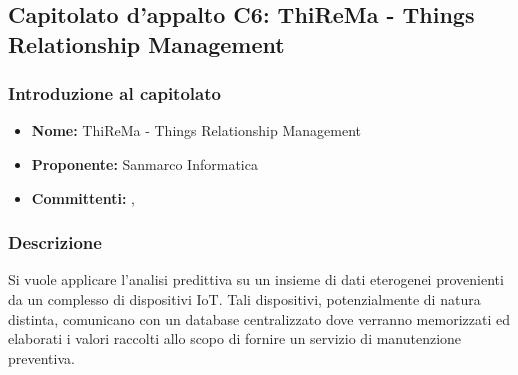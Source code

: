 \subsection{Capitolato d'appalto C6: ThiReMa - Things Relationship Management}
	\subsubsection{Introduzione al capitolato}
	\begin{itemize}
		\item \textbf{Nome:} ThiReMa - Things Relationship Management
		\item \textbf{Proponente:} Sanmarco Informatica
		\item \textbf{Committenti:} \TV, \RC
	\end{itemize}
	\subsubsection{Descrizione}
	Si vuole applicare l'analisi predittiva su un insieme di dati eterogenei provenienti da un complesso di dispositivi IoT. Tali dispositivi, potenzialmente di natura distinta, comunicano con un database centralizzato dove verranno memorizzati ed elaborati i valori raccolti allo scopo di fornire un servizio di manutenzione preventiva.  
